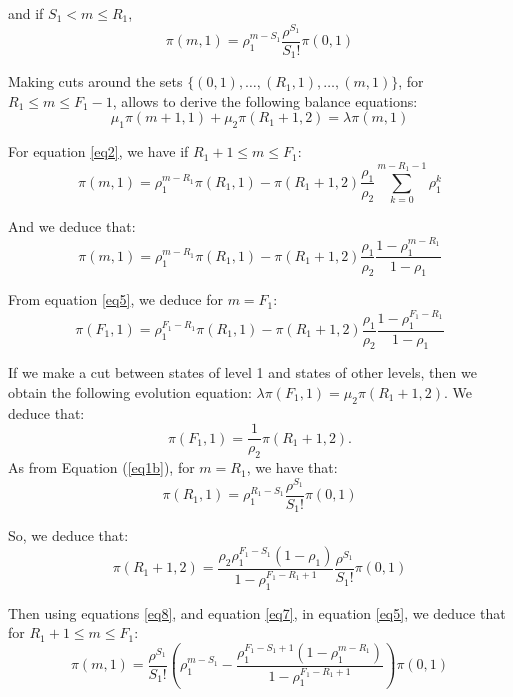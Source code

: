 \documentclass[conference]{IEEEtran}
\begin{document}
\noindent and if $S_1<  m \leq R_1$, 
\begin{equation}
 \pi(m,1)=\rho_1^{m-S_1} \frac{\rho^{S_1}}{S_1!}\pi(0,1)
 \label{eq1b}
 \end{equation}

\noindent Making cuts around the sets $\{(0,1), \ldots,(R_1,1), \ldots, (m,1)\}$, for  $R_1 \leq m \leq   F_1-1$, allows to derive  the following balance equations:
 \begin{equation}
 \mu_1 \pi(m+1,1) + \mu_2 \pi(R_1+1,2)  = \lambda \pi(m,1)\label{eq2}
 \end{equation}


\noindent For equation \ref{eq2}, we have if $R_1+1 \leq m \leq   F_1$:
\begin{equation}
\pi(m,1)=\rho_1^{m-R_1} \pi(R_1,1)-\pi(R_1+1,2)\frac{\rho_1}{\rho_2}\sum_{k=0}^{m-R_1-1} \rho_1^k \label{eq4}
\end{equation}

\noindent And we deduce that:
\begin{equation}
\pi(m,1)=\rho_1^{m-R_1} \pi(R_1,1)-\pi(R_1+1,2)\frac{\rho_1}{\rho_2}\frac{1-\rho_1^{m-R_1}}{1-\rho_1}  \label{eq5}
\end{equation}

\noindent From equation \ref{eq5}, we deduce for $m=F_1$:
\begin{equation}
\pi(F_1,1)=\rho_1^{F_1-R_1} \pi(R_1,1)-\pi(R_1+1,2)\frac{\rho_1}{\rho_2}\frac{1-\rho_1^{F_1-R_1}}{1-\rho_1} \label{eq6}
\end{equation}

\noindent If we make a cut between states of level 1 and states of other levels, then   we obtain the following evolution equation: $\lambda \pi(F_1,1) = \mu_2 \pi(R_1+1,2)$.  We deduce that:
 $$\pi(F_1,1)=\frac{1}{\rho_2} \pi(R_1+1,2).$$
\noindent As  from Equation (\ref{eq1b}), for $m=R_1$, we have that:
\begin{equation}
\pi(R_1,1)=\rho_1^{R_1-S_1} \frac{\rho^{S_1}}{S_1!}\pi(0,1)
\label{eq8}
\end{equation}

\noindent So, we deduce that:
\begin{equation}
\pi(R_1+1,2)= \frac{\rho_2 \rho_1^{F_1-S_1} (1-\rho_1)} {1-\rho_1^{F_1-R_1+1}}  \frac{\rho^{S_1}}{S_1!}\pi(0,1)
\label{eq7}
\end{equation}



\noindent Then using equations \ref{eq8}, and equation \ref{eq7}, in equation \ref{eq5}, we deduce that
for $R_1+1 \leq m \leq  F_1$:
\begin{equation}
\pi(m,1)= \frac{\rho^{S_1}}{S_1!}(\rho_1^{m-S_1}- \frac{ \rho_1^{F_1-S_1+1} (1-\rho_1^{m-R_1})} {1-\rho_1^{F_1-R_1+1}}) \pi(0,1)
\label{eq1c}
\end{equation}
\end{document}
